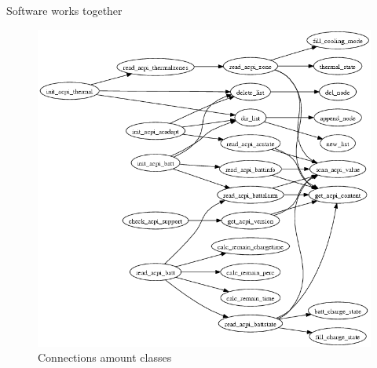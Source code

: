 \documentclass{beamer}
\begin{document}

\begin{frame}{Software works together}
    \begin{figure}
        \includegraphics[height=.7\paperheight]{figure/graph.png}
        \caption{Connections amount classes}
        \label{fig:classConnection}
    \end{figure}
\end{frame}

\end{document}
